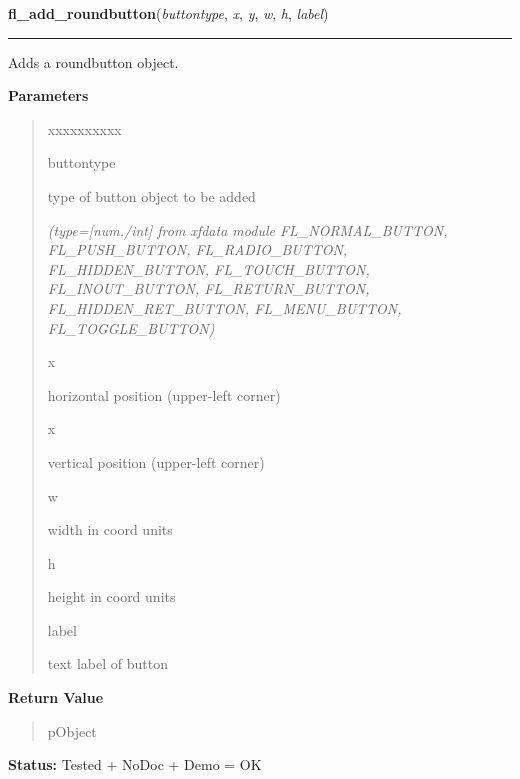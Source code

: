 \hspace{.8\funcindent}\begin{boxedminipage}{\funcwidth}

    \raggedright \textbf{fl\_add\_roundbutton}(\textit{buttontype}, \textit{x}, \textit{y}, \textit{w}, \textit{h}, \textit{label})

    \vspace{-1.5ex}

    \rule{\textwidth}{0.5\fboxrule}
\setlength{\parskip}{2ex}
    Adds a roundbutton object.

\setlength{\parskip}{1ex}
      \textbf{Parameters}
      \vspace{-1ex}

      \begin{quote}
        \begin{Ventry}{xxxxxxxxxx}

          \item[buttontype]

          type of button object to be added

            {\it (type=[num./int] from xfdata module FL\_NORMAL\_BUTTON, FL\_PUSH\_BUTTON, 
FL\_RADIO\_BUTTON, FL\_HIDDEN\_BUTTON, FL\_TOUCH\_BUTTON, 
FL\_INOUT\_BUTTON, FL\_RETURN\_BUTTON, FL\_HIDDEN\_RET\_BUTTON, 
FL\_MENU\_BUTTON, FL\_TOGGLE\_BUTTON)}

          \item[x]

          horizontal position (upper-left corner)

          \item[x]

          vertical position (upper-left corner)

          \item[w]

          width in coord units

          \item[h]

          height in coord units

          \item[label]

          text label of button

        \end{Ventry}

      \end{quote}

      \textbf{Return Value}
    \vspace{-1ex}

      \begin{quote}
      pObject

      \end{quote}

\textbf{Status:} Tested + NoDoc + Demo = OK



    \end{boxedminipage}

